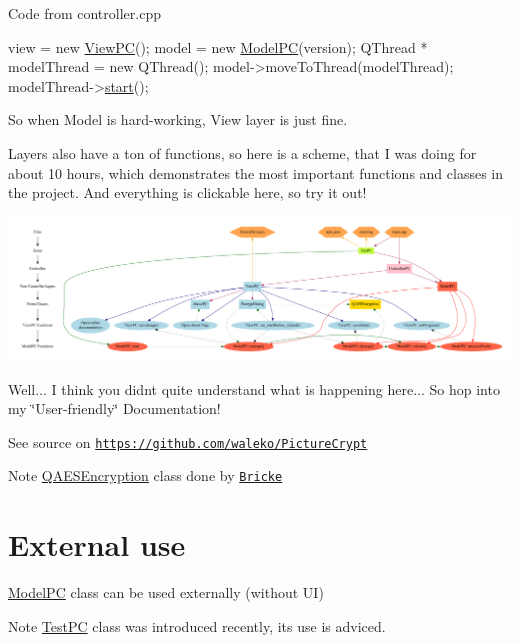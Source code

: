 Code from controller.\+cpp 
\begin{DoxyCode}
view = \textcolor{keyword}{new} \mbox{\hyperlink{class_view_p_c}{ViewPC}}();
model = \textcolor{keyword}{new} \mbox{\hyperlink{class_model_p_c}{ModelPC}}(version);
QThread * modelThread = \textcolor{keyword}{new} QThread();
model->moveToThread(modelThread);
modelThread->\mbox{\hyperlink{class_model_p_c_a3cae34fd5bcb06e8c1f8cfe7961bd270}{start}}();
\end{DoxyCode}
 So when Model is hard-\/working, View layer is just fine.

Layers also have a ton of functions, so here is a scheme, that I was doing for about 10 hours, which demonstrates the most important functions and classes in the project. And everything is clickable here, so try it out! 
\begin{DoxyImageNoCaption}
  \mbox{\includegraphics[width=\textwidth,height=\textheight/2,keepaspectratio=true]{dot_mainpage}}
\end{DoxyImageNoCaption}
 Well... I think you didn\textquotesingle{}t quite understand what is happening here... So hop into my \char`\"{}\+User-\/friendly\char`\"{} Documentation!

See source on \href{https://github.com/waleko/PictureCrypt}{\tt https\+://github.\+com/waleko/\+Picture\+Crypt}

\begin{DoxyNote}{Note}
\mbox{\hyperlink{class_q_a_e_s_encryption}{Q\+A\+E\+S\+Encryption}} class done by \href{https://github.com/bricke}{\tt Bricke}
\end{DoxyNote}
\hypertarget{index_ext-use}{}\section{External use}\label{index_ext-use}
\mbox{\hyperlink{class_model_p_c}{Model\+PC}} class can be used externally (without UI) \begin{DoxyNote}{Note}
\mbox{\hyperlink{class_test_p_c}{Test\+PC}} class was introduced recently, its use is adviced.
\end{DoxyNote}

